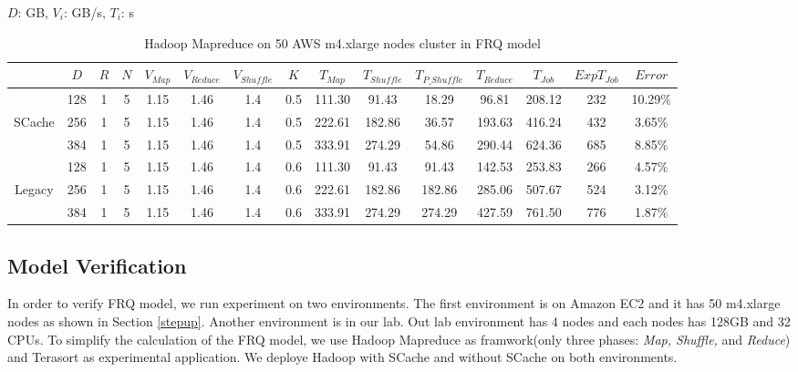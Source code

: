 {\begin{table}[!t]

\renewcommand{\arraystretch}{1.3}
\caption{\color{blue}Hadoop Mapreduce on 50 AWS m4.xlarge nodes cluster in FRQ model}
\label{table2}
\centering
\(D\): GB, \(V_{i}\): GB/s, \(T_{i}\): s
\begin{tabular}{|c||c|c|c|c|c|c|c||c|c|c|c|c|c|c|}
\hline
 &
\(D\) &	
\(R\) &	
\(N\) &	
\(V_{Map}\) &	
\(V_{Reduce}\) &	
\(V_{Shuffle}\) &	
\(K\) &	
\(T_{Map}\) &	
\(T_{Shuffle}\) &	
\(T_{P\_Shuffle}\) &
\(T_{Reduce}\) & 
\(T_{Job}\) & 
\(Exp T_{Job}\) &
\(Error\)\\

\hline
& 128	& 1 & 5 &	1.15 &	1.46	&	1.4 &	0.5 &	111.30 &	91.43	&	18.29	&	96.81	&	208.12	&	232	&	10.29\%	\\
SCache
& 256	& 1 & 5 &	1.15 &	1.46	&	1.4 &	0.5 &	222.61 &	182.86	&	36.57	&	193.63	&	416.24	&	432	&	3.65\%	\\
& 384	& 1 & 5 &	1.15 &	1.46	&	1.4 &	0.5 &	333.91 &	274.29	&	54.86	&	290.44	&	624.36	&	685 &	8.85\%	\\
\hline
& 128	& 1 & 5 &	1.15 &	1.46	&	1.4 &	0.6 &	111.30 &	91.43	&	91.43	&	142.53	&	253.83	&	266 &	4.57\%	\\
Legacy
& 256	& 1 & 5 &	1.15 &	1.46	&	1.4 &	0.6 &	222.61 &	182.86	&	182.86	&	285.06	&	507.67	&	524 &	3.12\%	\\
& 384	& 1 & 5 &	1.15 &	1.46	&	1.4 &	0.6 &	333.91 &	274.29	&	274.29	&	427.59	&	761.50	&	776 &	1.87\%	\\

\hline
\end{tabular}
\end{table}

\subsection{Model Verification}\label{model_verification}
In order to verify FRQ model, we run experiment on two environments. The first environment is on Amazon EC2 and it has 50 m4.xlarge nodes as shown in Section \ref{stepup}. Another environment is in our lab. Out lab environment has 4 nodes and each nodes has 128GB and 32 CPUs. To simplify the calculation of the FRQ model, we use Hadoop Mapreduce as framwork(only three phases: \textit{Map, Shuffle,} and \textit{Reduce}) and Terasort as experimental application. We deploye Hadoop with SCache and without SCache on both environments.

}
